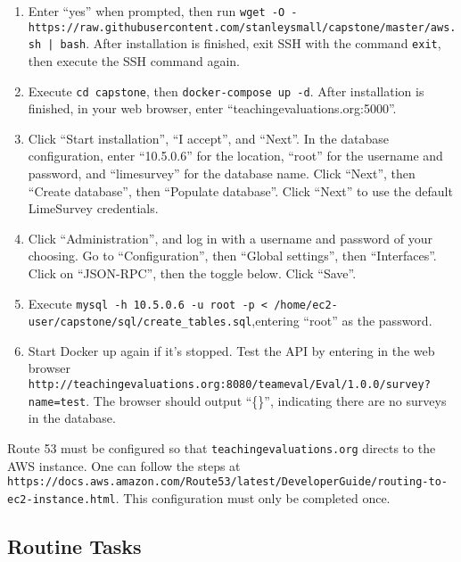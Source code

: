 \documentclass{article}
\begin{document}
\begin{enumerate}
    \item Enter ``yes'' when prompted, then run \verb+wget -O - https://raw.githubusercontent.com+\newline\verb+/stanleysmall/capstone/master/aws.sh | bash+. After installation is finished, exit SSH with the command \verb|exit|, then execute the SSH command again.

    \item Execute \verb|cd capstone|, then \verb|docker-compose up -d|. After installation is finished, in your web \newline browser, enter ``teachingevaluations.org:5000''.

    \item Click ``Start installation'', ``I accept'', and ``Next''. In the database configuration, enter ``10.5.0.6'' for the location, ``root'' for the username and password, and ``limesurvey'' for the database name. Click ``Next'', then ``Create database'', then ``Populate database''. Click ``Next'' to use the default LimeSurvey credentials.

    \item Click ``Administration'', and log in with a username and password of your choosing. Go to ``Configuration'', then ``Global settings'', then ``Interfaces''. Click on ``JSON-RPC'', then the toggle below. Click ``Save''.

    \item Execute \verb|mysql -h 10.5.0.6 -u root -p < /home/ec2-user/capstone/sql/create_tables.sql|,\newline entering ``root'' as the password.

    \item Start Docker up again if it's stopped. Test the API by entering in the web browser \newline \verb|http://teachingevaluations.org:8080/teameval/Eval/1.0.0/survey?name=test|. The browser should output ``\{\}'', indicating there are no surveys in the database.
\end{enumerate}

\vspace{4mm}

Route 53 must be configured so that \verb|teachingevaluations.org| directs to the AWS instance. One can follow the steps at \verb|https://docs.aws.amazon.com/Route53/latest/DeveloperGuide/|\newline \verb|routing-to-ec2-instance.html|. This configuration must only be completed once. 

\subsection{Routine Tasks}
\end{document}
